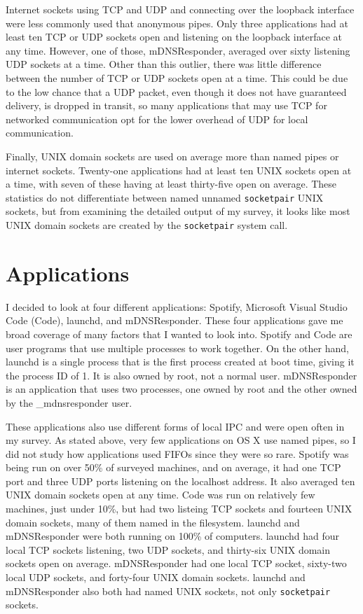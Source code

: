 Internet sockets using TCP and UDP and connecting over the loopback interface were less commonly used that anonymous pipes.  Only three applications had at least ten TCP or UDP sockets open and listening on the loopback interface at any time.  However, one of those, mDNSResponder, averaged over sixty listening UDP sockets at a time.  Other than this outlier, there was little difference between the number of TCP or UDP sockets open at a time.  This could be due to the low chance that a UDP packet, even though it does not have guaranteed delivery, is dropped in transit, so many applications that may use TCP for networked communication opt for the lower overhead of UDP for local communication.

Finally, UNIX domain sockets are used on average more than named pipes or internet sockets.  Twenty-one applications had at least ten UNIX sockets open at a time, with seven of these having at least thirty-five open on average.  These statistics do not differentiate between named unnamed \texttt{socketpair} UNIX sockets, but from examining the detailed output of my survey, it looks like most UNIX domain sockets are created by the \texttt{socketpair} system call.

\section{Applications}
\label{sec:applications}
I decided to look at four different applications: Spotify, Microsoft Visual Studio Code (Code), launchd, and mDNSResponder.  These four applications gave me broad coverage of many factors that I wanted to look into.  Spotify and Code are user programs that use multiple processes to work together.  On the other hand, launchd is a single process that is the first process created at boot time, giving it the process ID of 1.  It is also owned by root, not a normal user.  mDNSResponder is an application that uses two processes, one owned by root and the other owned by the \_mdnsresponder user.

These applications also use different forms of local IPC and were open often in my survey.  As stated above, very few applications on OS X use named pipes, so I did not study how applications used FIFOs since they were so rare.  Spotify was being run on over 50\% of surveyed machines, and on average, it had one TCP port and three UDP ports listening on the localhost address.  It also averaged ten UNIX domain sockets open at any time.  Code was run on relatively few machines, just under 10\%, but had two listeing TCP sockets and fourteen UNIX domain sockets, many of them named in the filesystem.  launchd and mDNSResponder were both running on 100\% of computers.  launchd had four local TCP sockets listening, two UDP sockets, and thirty-six UNIX domain sockets open on average.  mDNSResponder had one local TCP socket, sixty-two local UDP sockets, and forty-four UNIX domain sockets.  launchd and mDNSResponder also both had named UNIX sockets, not only \texttt{socketpair} sockets.

